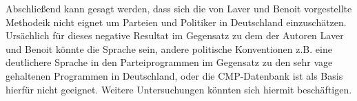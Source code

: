 Abschließend kann gesagt werden, dass sich die von Laver und Benoit vorgestellte Methodeik nicht eignet um Parteien und Politiker in Deutschland einzuschätzen. Ursächlich für dieses negative Resultat im Gegensatz zu dem der Autoren Laver und Benoit könnte die Sprache sein, andere politische Konventionen z.B. eine deutlichere Sprache in den Parteiprogrammen im Gegensatz zu den sehr vage gehaltenen Programmen in Deutschland, oder die CMP-Datenbank ist als Basis hierfür nicht geeignet.
Weitere Untersuchungen könnten sich hiermit beschäftigen.




